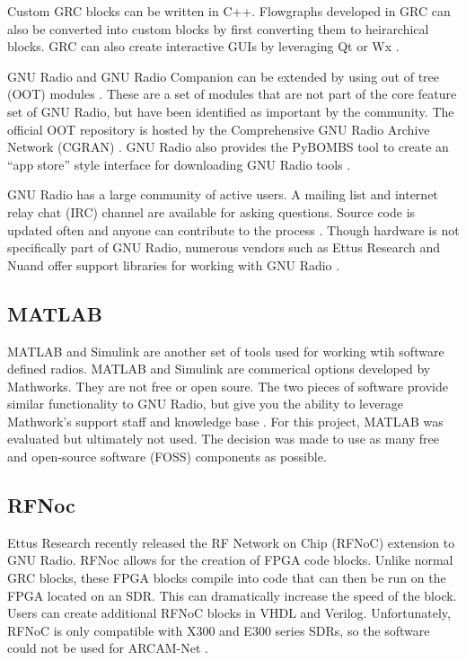 Custom GRC blocks can be written in C++. Flowgraphs developed in GRC can also be converted into custom blocks by first converting them to heirarchical blocks. GRC can also create interactive GUIs by leveraging Qt or Wx \cite{0023}. 

GNU Radio and GNU Radio Companion can be extended by using out of tree (OOT) modules \cite{0024}. These are a set of modules that are not part of the core feature set of GNU Radio, but have been identified as important by the community. The official OOT repository is hosted by the Comprehensive GNU Radio Archive Network (CGRAN) \cite{0025}. GNU Radio also provides the PyBOMBS tool to create an ``app store'' style interface for downloading GNU Radio tools \cite{0024}. 

GNU Radio has a large community of active users. A mailing list and internet relay chat (IRC) channel are available for asking questions. Source code is updated often and anyone can contribute to the process \cite{0003}. Though hardware is not specifically part of GNU Radio, numerous vendors such as Ettus Research and Nuand offer support libraries for working with GNU Radio \cite{0026}. 

\subsection{MATLAB}

MATLAB and Simulink are another set of tools used for working wtih software defined radios. MATLAB and Simulink are commerical options developed by Mathworks. They are not free or open soure. The two pieces of software provide similar functionality to GNU Radio, but give you the ability to leverage Mathwork's support staff and knowledge base \cite{0027}. For this project, MATLAB was evaluated but ultimately not used. The decision was made to use as many free and open-source software (FOSS) components as possible. 

\subsection{RFNoc}

Ettus Research recently released the RF Network on Chip (RFNoC) extension to GNU Radio. RFNoc allows for the creation of FPGA code blocks. Unlike normal GRC blocks, these FPGA blocks compile into code that can then be run on the FPGA located on an SDR. This can dramatically increase the speed of the block. Users can create additional RFNoC blocks in VHDL and Verilog. Unfortunately, RFNoC is only compatible with X300 and E300 series SDRs, so the software could not be used for ARCAM-Net \cite{0028}. 

